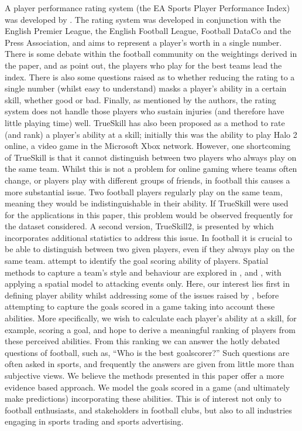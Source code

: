 \documentclass[11pt,a4paper]{article}
\begin{document}
A player performance rating system (the EA Sports Player Performance 
Index) was developed by \cite{mchale_2012}. The rating system was  
developed in conjunction with the English Premier League, the English 
Football League, Football DataCo and the Press Association, and aims 
to represent a player's worth in a single number. There is some debate 
within the football community on the weightings derived in the paper, 
and as \cite{mchale_2012} point out, the players who play for the best 
teams lead the index. There is also some questions raised as to whether 
reducing the rating to a single number (whilst easy to understand) 
masks a player's ability in a certain skill, whether good or bad. 
Finally, as mentioned by the authors, the rating system does not 
handle those players who sustain injuries (and therefore have little 
playing time) well. 
TrueSkill\texttrademark \citep{herbrich_2007} has also been proposed 
as a method to rate (and rank) a player's ability at a skill; initially 
this was the ability to play Halo 2 online, a video game in the Microsoft Xbox network. 
However, one shortcoming  of TrueSkill is that it cannot distinguish between two players who 
always play on the same team. Whilst this is not a problem for online 
gaming where teams often change, or players play with different groups of 
friends, in football this causes a more substantial issue. Two football 
players regularly play on the same team, meaning they would be 
indistinguishable in their ability. If TrueSkill were used for the applications in  
this paper, this problem would be observed frequently for the dataset 
considered. A second version, TrueSkill2, is presented 
by \cite{minka_2018} which incorporates additional statistics 
to address this issue. In football it is crucial to be able to distinguish 
between two given players, even if they always play on the same team. 
\cite{mchale_2014} attempt to identify the goal 
scoring ability of players. Spatial methods to capture a team's 
style and behaviour are explored in \cite{lucey_2013}, 
\cite{bialkowski_2014} and \cite{bojinov_2016}, with \cite{whitaker_2018} 
applying a spatial model to attacking events only. Here, our interest 
lies first in defining player ability whilst addressing some of the issues 
raised by \cite{mchale_2012}, before attempting to capture the 
goals scored in a game taking into account these abilities.
More specifically, we wish to calculate each player's ability at a skill, 
for example, scoring a goal, and hope to derive a meaningful ranking of players 
from these perceived abilities. From this ranking we can answer the 
hotly debated questions of football, such as, ``Who is the 
best goalscorer?'' Such questions are often asked in sports, 
and frequently the answers are given from little more than subjective 
views. We believe the methods presented in this paper offer a more 
evidence based approach. We model the goals scored in a game 
(and ultimately make predictions) incorporating these abilities.
This is of interest not only to football enthusiasts, and stakeholders in 
football clubs, but also to all industries engaging in sports trading and sports advertising.
\end{document}
